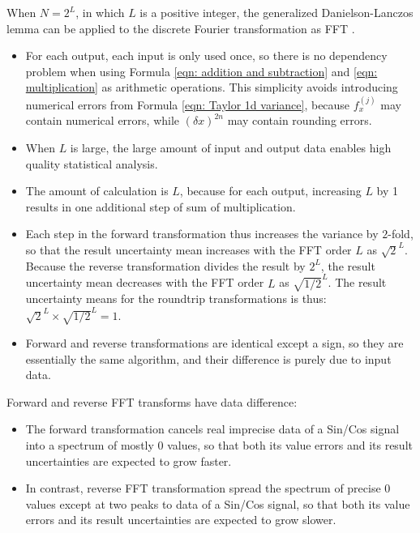 \documentclass[twoside]{article}
\numberwithin{equation}{section}
\begin{document}
When $N = 2^{L}$, in which $L$ is a positive integer, the generalized Danielson-Lanczos lemma \cite{Numerical_Recipes} can be applied to the discrete Fourier transformation as FFT \cite{Numerical_Recipes}. 
\begin{itemize}

\item For each output, each input is only used once, so there is no dependency problem when using Formula \eqref{eqn: addition and subtraction} and \eqref{eqn: multiplication} as arithmetic operations.
This simplicity avoids introducing numerical errors from Formula \eqref{eqn: Taylor 1d variance}, because $f^{(j)}_x$ may contain numerical errors, while $(\delta x)^{2n}$ may contain rounding errors.

\item When $L$ is large, the large amount of input and output data enables high quality statistical analysis.

\item The amount of calculation is $L$, because for each output, increasing $L$ by 1 results in one additional step of sum of multiplication.

\item Each step in the forward transformation thus increases the variance by $2$-fold, so that the result uncertainty mean increases with the FFT order $L$ as $\sqrt{2}^L$.
Because the reverse transformation divides the result by $2^L$, the result uncertainty mean decreases with the FFT order $L$ as $\sqrt{1/2}^L$.
The result uncertainty means for the roundtrip transformations is thus: $\sqrt{2}^L \times \sqrt{1/2}^L = 1$.

\item Forward and reverse transformations are identical except a sign, so they are essentially the same algorithm, and their difference is purely due to input data.  

\end{itemize}

Forward and reverse FFT transforms have data difference:
\begin{itemize}
\item The forward transformation cancels real imprecise data of a Sin/Cos signal into a spectrum of mostly $0$ values, so that both its value errors and its result uncertainties are expected to grow faster. 

\item In contrast, reverse FFT transformation spread the spectrum of precise $0$ values except at two peaks to data of a Sin/Cos signal, so that both its value errors and its result uncertainties are expected to grow slower. 
\end{itemize}
\end{document}

